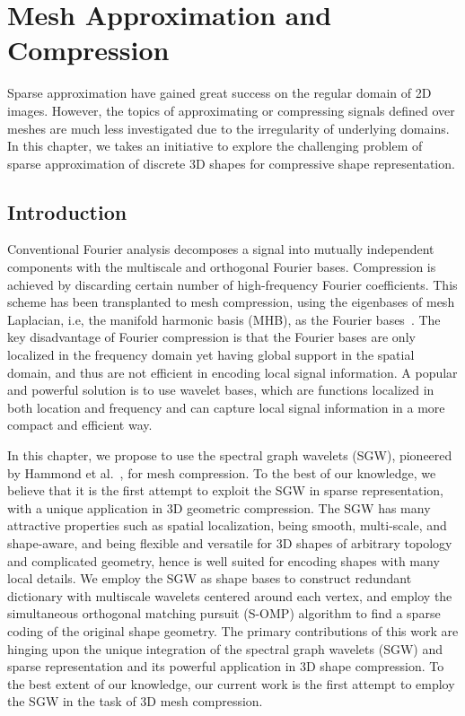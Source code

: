 \chapter{Mesh Approximation and Compression}

Sparse approximation have gained great success on the regular domain 
of 2D images. However, the topics of approximating or compressing signals defined 
over meshes are much less investigated due to the irregularity of 
underlying domains. In this chapter, we
takes an initiative to explore the challenging problem of sparse
approximation of discrete 3D shapes for compressive shape representation.

\section{Introduction}

Conventional Fourier analysis decomposes a signal into mutually
independent components with the multiscale and orthogonal Fourier
bases. Compression is achieved by discarding certain number of
high-frequency Fourier coefficients. This scheme has been transplanted
to mesh compression, using the eigenbases of mesh Laplacian, i.e, the
manifold harmonic basis (MHB), as the Fourier
bases~\cite{Karni2000}. The key disadvantage of Fourier
compression is that the Fourier bases are only localized in the
frequency domain yet having global support in the spatial domain, and
thus are not efficient in encoding local signal information. A popular
and powerful solution is to use wavelet bases, which are functions
localized in both location and frequency and can capture local signal
information in a more compact and efficient way.

In this chapter, we propose to use the spectral graph wavelets (SGW),
pioneered by Hammond et al.~\cite{Hammond2011}, for mesh
compression. To the best of our knowledge, we believe that it is the
first attempt to exploit the SGW in sparse representation, with a
unique application in 3D geometric compression. The SGW has many
attractive properties such as spatial localization, being smooth,
multi-scale, and shape-aware, and being flexible and versatile for 3D
shapes of arbitrary topology and complicated geometry, hence is well
suited for encoding shapes with many local details. We employ the SGW
as shape bases to construct redundant dictionary with multiscale
wavelets centered around each vertex, and employ the simultaneous
orthogonal matching pursuit (S-OMP) algorithm to find a sparse coding
of the original shape geometry. The primary contributions of this work
are hinging upon the unique integration of the spectral graph wavelets
(SGW) and sparse representation and its powerful application in 3D
shape compression. To the best extent of our knowledge, our current 
work is the first attempt to employ the SGW in the task of 3D mesh compression.

